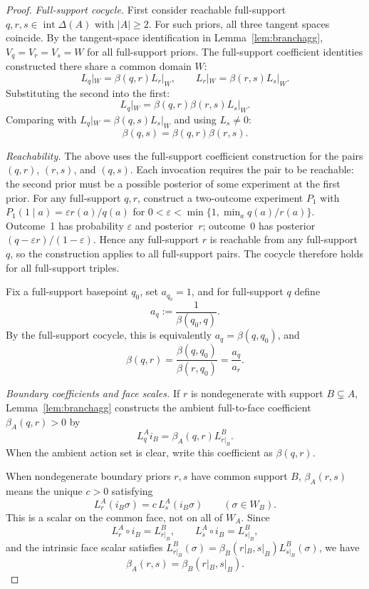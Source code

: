 \documentclass[11pt,a4paper]{article}
\theoremstyle{definition}
\newcommand{\1}{\mathbf 1}
\begin{document}
\begin{proof}

\emph{Full-support cocycle.}  First consider reachable full-support $q,r,s\in\operatorname{int}\Delta(A)$ with $|A|\ge2$.
For such priors, all three tangent spaces coincide.
By the tangent-space identification in Lemma~\ref{lem:branchagg}, $V_q=V_r=V_s=W$ for all full-support priors.
The full-support coefficient identities constructed there share a common domain $W$:
\[
L_q|_W=\beta(q,r)L_r|_W,
\qquad
L_r|_W=\beta(r,s)L_s|_W.
\]
Substituting the second into the first:
\[
L_q|_W=\beta(q,r)\beta(r,s)L_s|_W.
\]
Comparing with $L_q|_W=\beta(q,s)L_s|_W$ and using $L_s\ne 0$:
\[
\beta(q,s)=\beta(q,r)\beta(r,s).
\]

\emph{Reachability.}  The above uses the full-support coefficient construction for the pairs $(q,r)$, $(r,s)$, and
$(q,s)$.  Each invocation requires the pair to be reachable: the second prior must be a possible posterior of some
experiment at the first prior.
For any full-support $q,r$, construct a two-outcome experiment $P_1$ with $P_1(1\mid a)=\varepsilon r(a)/q(a)$ for
$0<\varepsilon<\min\{1,\min_a q(a)/r(a)\}$.  Outcome~1 has probability $\varepsilon$ and posterior~$r$; outcome~0 has posterior
$(q-\varepsilon r)/(1-\varepsilon)$.  Hence any full-support $r$ is reachable from any full-support $q$, so the construction
applies to all full-support pairs.  The cocycle therefore holds for all full-support triples.

Fix a full-support basepoint $q_0$, set $a_{q_0}=1$, and for full-support $q$ define
\[
a_q:=\frac{1}{\beta(q_0,q)}.
\]
By the full-support cocycle, this is equivalently $a_q=\beta(q,q_0)$, and
\[
\beta(q,r)=\frac{\beta(q,q_0)}{\beta(r,q_0)}=\frac{a_q}{a_r}.
\]

\emph{Boundary coefficients and face scales.}  If $r$ is nondegenerate with support $B\subsetneq A$, Lemma~\ref{lem:branchagg}
constructs the ambient full-to-face coefficient $\beta_A(q,r)>0$ by
\[
L_q^A i_B=\beta_A(q,r)L_{r|_B}^B .
\]
When the ambient action set is clear, write this coefficient as $\beta(q,r)$.

When nondegenerate boundary priors $r,s$ have common support $B$, $\beta_A(r,s)$ means the unique $c>0$ satisfying
\[
L_r^A(i_B\sigma)=c\,L_s^A(i_B\sigma)\qquad(\sigma\in W_B).
\]
This is a scalar on the common face, not on all of $W_A$.  Since
\[
L_r^A\circ i_B=L_{r|_B}^B,\qquad L_s^A\circ i_B=L_{s|_B}^B,
\]
and the intrinsic face scalar satisfies
$L_{r|_B}^B(\sigma)=\beta_B(r|_B,s|_B)L_{s|_B}^B(\sigma)$, we have
\[
\beta_A(r,s)=\beta_B(r|_B,s|_B).
\]


\end{proof}
\end{document}
